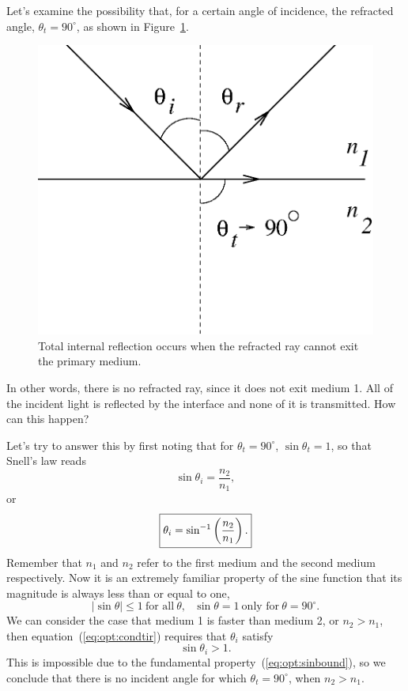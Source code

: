 Let's examine the possibility that, for a certain angle of incidence, the 
refracted angle, $\theta_t=90^\circ$, as shown in 
Figure~\ref{fig:opt:totintref}.
\begin{figure}[htb]
\centering 
\epsfxsize=6cm \includegraphics[scale=0.6]{8_optics/totintref.eps}
\caption{Total internal reflection occurs when the refracted ray cannot exit
the primary medium.}
\label{fig:opt:totintref}
\end{figure}
In other words, there is no refracted ray, since it does not exit medium 1.
All of the incident light is reflected by the interface and none of it is
transmitted. How can this happen?

Let's try to answer this by first noting that for $\theta_t=90^\circ$,
$\sin\theta_t=1$, so that Snell's law reads
\begin{equation}
\sin\theta_i=\frac{n_2}{n_1},  \label{eq:opt:condtir}
\end{equation}
or 
$$
\fbox{$ \displaystyle \theta_i=\sin^{-1}\left(\frac{n_2}{n_1}\right). $} 
$$
Remember that $n_1$ and $n_2$ refer to the first medium
and the second medium respectively.  
Now it is an extremely familiar property of the sine function that its 
magnitude is always less than or equal to one,
\begin{equation}
|\sin\theta| \leq 1 ~\mbox{for all}~\theta, 
~~~\sin\theta=1 ~\mbox{only for}~\theta=90^\circ.  \label{eq:opt:sinbound}
\end{equation}
We can consider the case that medium 1 is faster than medium 2, or $n_2>n_1$,
then equation~(\ref{eq:opt:condtir}) requires that $\theta_i$ satisfy
$$
\sin\theta_i >1.
$$ 
This is impossible due to the fundamental property~(\ref{eq:opt:sinbound}),
so we conclude that there is no incident angle for which $\theta_t=90^\circ$,
when $n_2>n_1$.
 
